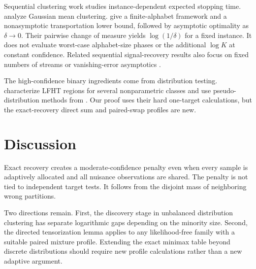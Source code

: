 \documentclass[twoside]{article}
\begin{document}
Sequential clustering work studies instance-dependent expected stopping time. \citet{yang2024clustering} analyze Gaussian mean clustering. \citet{yavas2025framework} give a finite-alphabet framework and a nonasymptotic transportation lower bound, followed by asymptotic optimality as $\delta\to0$. Their pairwise change of measure yields $\log(1/\delta)$ for a fixed instance. It does not evaluate worst-case alphabet-size phases or the additional $\log K$ at constant confidence. Related sequential signal-recovery results also focus on fixed numbers of streams or vanishing-error asymptotics \citep{song2017signal,juneja2019partition}.

The high-confidence binary ingredients come from distribution testing. \citet{gerber2023classification} characterize LFHT regions for several nonparametric classes and use pseudo-distribution methods from \citet{diakonikolas2021highprob}. Our proof uses their hard one-target calculations, but the exact-recovery direct sum and paired-swap profiles are new.

\section{Discussion}

Exact recovery creates a moderate-confidence penalty even when every sample is adaptively allocated and all nuisance observations are shared. The penalty is not tied to independent target tests. It follows from the disjoint mass of neighboring wrong partitions.

Two directions remain. First, the discovery stage in unbalanced distribution clustering has separate logarithmic gaps depending on the minority size. Second, the directed tensorization lemma applies to any likelihood-free family with a suitable paired mixture profile. Extending the exact minimax table beyond discrete distributions should require new profile calculations rather than a new adaptive argument.



\clearpage
\appendix
\end{document}
